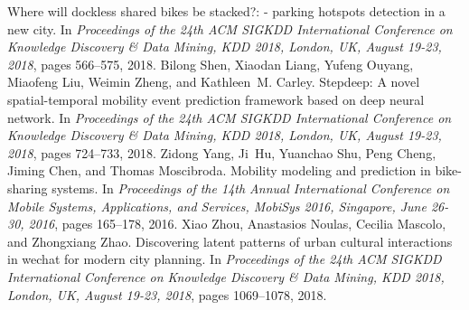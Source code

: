 \documentclass[conference]{IEEEtran}
\begin{document}
\begin{thebibliography}{00}
\newblock Where will dockless shared bikes be stacked?: - parking hotspots
detection in a new city.
\newblock In {\em Proceedings of the 24th {ACM} {SIGKDD} International
	Conference on Knowledge Discovery {\&} Data Mining, {KDD} 2018, London, UK,
	August 19-23, 2018}, pages 566--575, 2018.
 Bilong Shen, Xiaodan Liang, Yufeng Ouyang, Miaofeng Liu, Weimin Zheng, and
Kathleen~M. Carley.
\newblock Stepdeep: {A} novel spatial-temporal mobility event prediction
framework based on deep neural network.
\newblock In {\em Proceedings of the 24th {ACM} {SIGKDD} International
	Conference on Knowledge Discovery {\&} Data Mining, {KDD} 2018, London, UK,
	August 19-23, 2018}, pages 724--733, 2018.
 Zidong Yang, Ji~Hu, Yuanchao Shu, Peng Cheng, Jiming Chen, and Thomas
Moscibroda.
\newblock Mobility modeling and prediction in bike-sharing systems.
\newblock In {\em Proceedings of the 14th Annual International Conference on
	Mobile Systems, Applications, and Services, MobiSys 2016, Singapore, June
	26-30, 2016}, pages 165--178, 2016.
 Xiao Zhou, Anastasios Noulas, Cecilia Mascolo, and Zhongxiang Zhao.
\newblock Discovering latent patterns of urban cultural interactions in wechat
for modern city planning.
\newblock In {\em Proceedings of the 24th {ACM} {SIGKDD} International
	Conference on Knowledge Discovery {\&} Data Mining, {KDD} 2018, London, UK,
	August 19-23, 2018}, pages 1069--1078, 2018.
\end{thebibliography}
\end{document}

